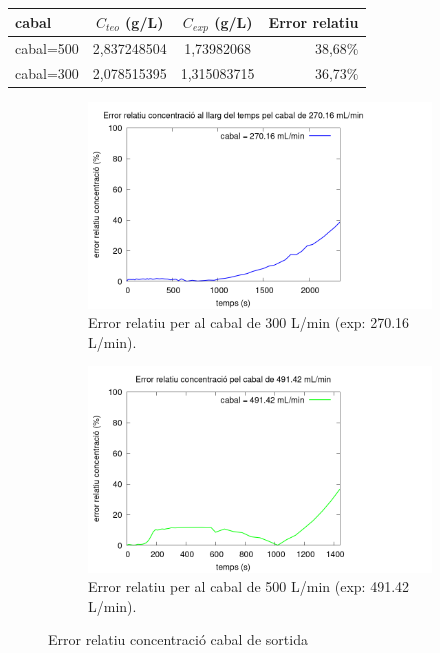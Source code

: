 \documentclass[10pt, twoside]{article}
\begin{document}
\begin{minipage}{\textwidth}
    \captionsetup{hypcap=false}
    \centering
    \label{tab: conce3tau}
    \begin{tabular}{|l|c|c|r|}
        \hline
        cabal       &	$C_{teo}$ (g/L)	&	$C_{exp}$ (g/L)	    &   Error relatiu	\\ \hline
        cabal=500	&	2,837248504	&	1,73982068	&	38,68$\%$	\\ \hline
        cabal=300	&	2,078515395	&	1,315083715	&	36,73$\%$	\\ \hline
    \end{tabular}
\end{minipage}

\pagebreak
\begin{figure}[h!]
    \centering
    \begin{subfigure}{0.45\textwidth}
        \centering
        \includegraphics[width=\textwidth]{error300.png}
        \caption{Error relatiu per al cabal de 300 L/min (exp: 270.16 L/min).}
        \label{fig: error300}
    \end{subfigure}
    \hspace{0.025\textwidth}
    \begin{subfigure}{0.45\textwidth}
        \centering
        \includegraphics[width=\textwidth]{error500.png}
        \caption{Error relatiu per al cabal de 500 L/min (exp: 491.42 L/min).}
        \label{fig: error500}
    \end{subfigure}
    \caption{Error relatiu concentració cabal de sortida}
    \label{fig: errors}
\end{figure}
\end{document}
